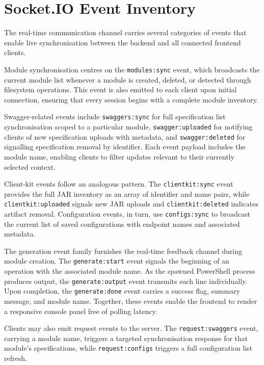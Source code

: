 \section{Socket.IO Event Inventory}

The real-time communication channel carries several categories of events that enable live synchronisation between the backend and all connected frontend clients.

Module synchronisation centres on the \texttt{modules:sync} event, which broadcasts the current module list whenever a module is created, deleted, or detected through filesystem operations. This event is also emitted to each client upon initial connection, ensuring that every session begins with a complete module inventory.

Swagger-related events include \texttt{swaggers:sync} for full specification list synchronisation scoped to a particular module, \texttt{swagger:uploaded} for notifying clients of new specification uploads with metadata, and \texttt{swagger:deleted} for signalling specification removal by identifier. Each event payload includes the module name, enabling clients to filter updates relevant to their currently selected context.

Client-kit events follow an analogous pattern. The \texttt{clientkit:sync} event provides the full JAR inventory as an array of identifier and name pairs, while \texttt{clientkit:uploaded} signals new JAR uploads and \texttt{clientkit:deleted} indicates artifact removal. Configuration events, in turn, use \texttt{configs:sync} to broadcast the current list of saved configurations with endpoint names and associated metadata.

The generation event family furnishes the real-time feedback channel during module creation. The \texttt{generate:start} event signals the beginning of an operation with the associated module name. As the spawned PowerShell process produces output, the \texttt{generate:output} event transmits each line individually. Upon completion, the \texttt{generate:done} event carries a success flag, summary message, and module name. Together, these events enable the frontend to render a responsive console panel free of polling latency.

Clients may also emit request events to the server. The \texttt{request:swaggers} event, carrying a module name, triggers a targeted synchronisation response for that module's specifications, while \texttt{request:configs} triggers a full configuration list refresh.

